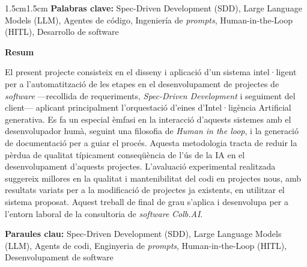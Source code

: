 \documentclass[11pt, letterpaper]{article}
\begin{document}
\begin{adjustwidth}{1.5cm}{1.5cm}
{\medskip
{
\small
\noindent\textbf{Palabras clave:} Spec-Driven Development (SDD), Large Language Models (LLM), Agentes de código, Ingeniería de \textit{prompts}, Human-in-the-Loop (HITL), Desarrollo de software
}
\vfill
\hspace{0pt}
}
\newpage

{ %
\hspace{0pt}
\vfill
\large
\begin{center}
{\textbf{Resum}}
\end{center}
El present projecte consisteix en el disseny i aplicació d'un sistema intel·ligent per a l'automatització de les etapes en el desenvolupament de projectes de \textit{software} ---recollida de requeriments, \textit{Spec-Driven Development} i seguiment del client--- aplicant principalment l'orquestació d'eines d'Intel·ligència Artificial generativa. Es fa un especial èmfasi en la interacció d'aquests sistemes amb el desenvolupador humà, seguint una filosofia de \textit{Human in the loop}, i la generació de documentació per a guiar el procés. Aquesta metodologia tracta de reduir la pèrdua de qualitat típicament conseqüència de l'ús de la IA en el desenvolupament d'aquests projectes. L'avaluació experimental realitzada suggereix millores en la qualitat i mantenibilitat del codi en projectes nous, amb resultats variats per a la modificació de projectes ja existents, en utilitzar el sistema proposat. Aquest treball de final de grau s'aplica i desenvolupa per a l'entorn laboral de la consultoria de \textit{software} \textit{Colb.AI}.

\medskip
{
\small
\noindent\textbf{Paraules clau:} Spec-Driven Development (SDD), Large Language Models (LLM), Agents de codi, Enginyeria de \textit{prompts}, Human-in-the-Loop (HITL), Desenvolupament de software
}
\vfill
\hspace{0pt}
}
\end{adjustwidth}

\newpage
\tableofcontents
\newpage
\listoffigures
\newpage

\listoftables

\newpage
\end{document}
